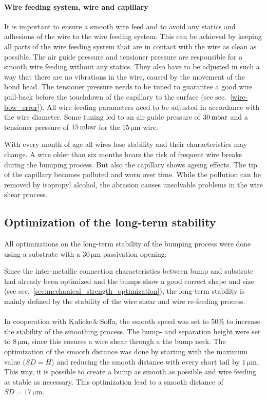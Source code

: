 \paragraph*{Wire feeding system, wire and capillary}
It is important to ensure a smooth wire feed and to avoid any statics and adhesions of the wire to the wire feeding system. This can be achieved by keeping all parts of the wire feeding system that are in contact with the wire as clean as possible. The air guide pressure and tensioner pressure are responsible for a smooth wire feeding without any statics. They also have to be adjusted in such a way that there are no vibrations in the wire, caused by the movement of the bond head. The tensioner pressure needs to be tuned to guarantee a good wire pull-back before the touchdown of the capillary to the surface (see sec.~\ref{wire-bow_error}). All wire feeding parameters need to be adjusted in accordance with the wire diameter. Some tuning led to an air guide pressure of $30\,\rm{mbar}$ and a tensioner pressure of $15\,\rm{mbar}$ for the $15\,\si{\micro \meter}$ wire.

With every month of age all wires lose stability and their characteristics may change. A wire older than six months bears the risk of frequent wire breaks during the bumping process. But also the capillary shows ageing effects. The tip of the capillary becomes polluted and worn over time. While the pollution can be removed by isopropyl alcohol, the abrasion causes unsolvable problems in the wire shear process. 

\subsection{Optimization of the long-term stability}
All optimizations on the long-term stability of the bumping process were done using a substrate with a $30\,\si{\micro \meter}$ passivation opening.

Since the inter-metallic connection characteristics between bump and substrate had already been optimized and the bumps show a good correct shape and size (see sec.~\ref{sec:mechanical_strength_optimization}), the long-term stability is mainly defined by the stability of the wire shear and wire re-feeding process.
\\
\\In cooperation with Kulicke$\,\&\,$Soffa, the smooth speed was set to $50\%$ to increase the stability of the smoothing process. The bump- and separation height were set to $8\,\si{\micro \meter}$, since this ensures a wire shear through a the bump neck. The optimization of the smooth distance was done by starting with the maximum value ($SD=H$) and reducing the smooth distance with every short tail by $1\,\si{\micro \meter}$. This way, it is possible to create a bump as smooth as possible and wire feeding as stable as necessary. This optimization lead to a smooth distance of $SD=17\,\si{\micro \meter}$.



